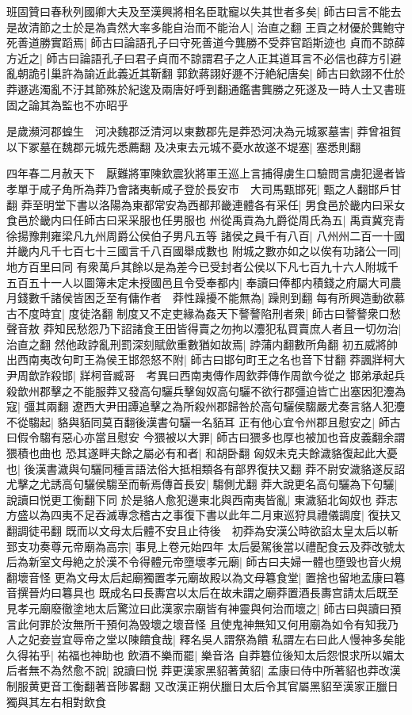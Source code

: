 班固贊曰春秋列國卿大夫及至漢興將相名臣耽寵以失其世者多矣|{
	師古曰言不能去}
是故清節之士於是為貴然大率多能自治而不能治人|{
	治直之翻}
王貢之材優於龔鮑守死善道勝實蹈焉|{
	師古曰論語孔子曰守死善道今龔勝不受莽官蹈斯迹也}
貞而不諒薛方近之|{
	師古曰論語孔子曰君子貞而不諒謂君子之人正其道耳言不必信也薛方引避亂朝詭引巢許為諭近此義近其靳翻}
郭欽蔣詡好遯不汙絶紀唐矣|{
	師古曰欽詡不仕於莽遯逃濁亂不汙其節殊於紀逡及兩唐好呼到翻通鑑書龔勝之死遂及一時人士又書班固之論其為監也不亦昭乎}


是歲瀕河郡蝗生　河决魏郡泛清河以東數郡先是莽恐河决為元城冢墓害|{
	莽曾祖賀以下冢墓在魏郡元城先悉薦翻}
及决東去元城不憂水故遂不堤塞|{
	塞悉則翻}


四年春二月赦天下　厭難將軍陳欽震狄將軍王巡上言捕得虜生口驗問言虜犯邊者皆孝單于咸子角所為莽乃會諸夷斬咸子登於長安市　大司馬甄邯死|{
	甄之人翻邯戶甘翻}
莽至明堂下書以洛陽為東都常安為西都邦畿連體各有采任|{
	男食邑於畿内曰采女食邑於畿内曰任師古曰采采服也任男服也}
州從禹貢為九爵從周氏為五|{
	禹貢冀兖青徐揚豫荆雍梁凡九州周爵公侯伯子男凡五等}
諸侯之員千有八百|{
	八州州二百一十國并畿内凡千七百七十三國言千八百國舉成數也}
附城之數亦如之以俟有功諸公一同|{
	地方百里曰同}
有衆萬戶其餘以是為差今已受封者公侯以下凡七百九十六人附城千五百五十一人以圖簿未定未授國邑且令受奉都内|{
	奉讀曰俸都内積錢之府屬大司農}
月錢數千諸侯皆困乏至有傭作者　莽性躁擾不能無為|{
	躁則到翻}
每有所興造動欲慕古不度時宜|{
	度徒洛翻}
制度又不定吏緣為姦天下謷謷陷刑者衆|{
	師古曰謷謷衆口愁聲音敖}
莽知民愁怨乃下詔諸食王田皆得賣之勿拘以灋犯私買賣庶人者且一切勿治|{
	治直之翻}
然他政誖亂刑罰深刻賦歛重數猶如故焉|{
	誖蒲内翻數所角翻}
初五威將帥出西南夷改句町王為侯王邯怨怒不附|{
	師古曰邯句町王之名也音下甘翻}
莽諷牂柯大尹周歆詐殺邯|{
	牂柯音臧哥　考異曰西南夷傳作周欽莽傳作周歆今從之}
邯弟承起兵殺歆州郡擊之不能服莽又發高句驪兵擊匈奴高句驪不欲行郡彊迫皆亡出塞因犯灋為寇|{
	彊其兩翻}
遼西大尹田譚追擊之為所殺州郡歸咎於高句驪侯騶嚴尤奏言貉人犯灋不從騶起|{
	貉與貊同莫百翻後漢書句驪一名貊耳}
正有他心宜令州郡且慰安之|{
	師古曰假令騶有惡心亦當且慰安}
今猥被以大罪|{
	師古曰猥多也厚也被加也音皮義翻余謂猥積也曲也}
恐其遂畔夫餘之屬必有和者|{
	和胡卧翻}
匈奴未克夫餘濊貉復起此大憂也|{
	後漢書濊與句驪同種言語法俗大抵相類各有部界復扶又翻}
莽不尉安濊貉遂反詔尤擊之尤誘高句驪侯騶至而斬焉傳首長安|{
	騶側尤翻}
莽大說更名高句驪為下句驪|{
	說讀曰悦更工衡翻下同}
於是貉人愈犯邊東北與西南夷皆亂|{
	東濊貊北匈奴也}
莽志方盛以為四夷不足吞滅專念稽古之事復下書以此年二月東巡狩具禮儀調度|{
	復扶又翻調徒弔翻}
既而以文母太后體不安且止待後　初莽為安漢公時欲諂太皇太后以斬郅支功奏尊元帝廟為高宗|{
	事見上卷元始四年}
太后晏駕後當以禮配食云及莽改號太后為新室文母絶之於漢不令得體元帝墮壞孝元廟|{
	師古曰夫婦一體也墮毁也音火規翻壞音怪}
更為文母太后起廟獨置孝元廟故殿以為文母篹食堂|{
	置捨也留地孟康曰篹音撰晉灼曰篹具也}
既成名曰長夀宫以太后在故未謂之廟莽置酒長夀宫請太后既至見孝元廟廢徹塗地太后驚泣曰此漢家宗廟皆有神靈與何治而壞之|{
	師古曰與讀曰預言此何罪於汝無所干預何為毁壞之壞音怪}
且使鬼神無知又何用廟為如令有知我乃人之妃妾豈宜辱帝之堂以陳饋食哉|{
	釋名吳人謂祭為饋}
私謂左右曰此人慢神多矣能久得祐乎|{
	祐福也神助也}
飲酒不樂而罷|{
	樂音洛}
自莽簒位後知太后怨恨求所以媚太后者無不為然愈不說|{
	說讀曰悦}
莽更漢家黑貂著黄貂|{
	孟康曰侍中所著貂也莽改漢制服黄更音工衡翻著音陟畧翻}
又改漢正朔伏臘日太后令其官屬黑貂至漢家正臘日獨與其左右相對飲食

